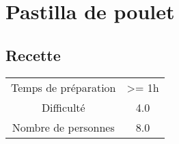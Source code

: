 \newpage
\section{Pastilla de poulet}
    \label{sec:Pastilla de poulet}
    \subsection{Recette}
    \vspace{1cm}


    \begin{center}
        \begin{tabular}{c|c}
            Temps de préparation & >= 1h \\
            Difficulté & 4.0 \\
            Nombre de personnes & 8.0 
        \end{tabular}
    \end{center}{}

    \vspace{1cm}
    \hline
    \vspace{1cm}

